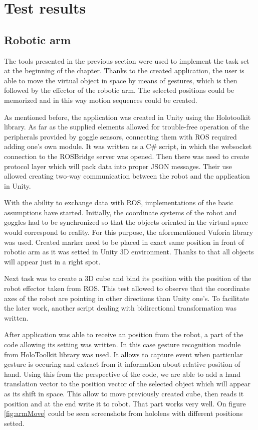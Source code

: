 \documentclass[printmode,en]{mgr}
\begin{document}
\section{Test results}

\subsection{Robotic arm}
The tools presented in the previous section were used to implement the task set at the beginning of the chapter. Thanks to the created application, the user is able to move the virtual object in space by means of gestures, which is then followed by the effector of the robotic arm. The selected positions could be memorized and in this way motion sequences could be created.

As mentioned before, the application was created in Unity using the Holotoolkit library. As far as the supplied elements allowed for trouble-free operation of the peripherals provided by goggle sensors, connecting them with ROS required adding one's own module. It was written as a C\# script, in which the websocket connection to the ROSBridge server was opened. Then there was need to create protocol layer which will pack data into proper JSON messages. Their use allowed creating two-way communication between the robot and the application in Unity.

With the ability to exchange data with ROS, implementations of the basic assumptions have started. Initially, the coordinate systems of the robot and goggles had to be synchronized so that the objects oriented in the virtual space would correspond to reality. For this purpose, the aforementioned Vuforia library was used. Created marker need to be placed in exact same position in front of robotic arm as it was setted in Unity 3D environment. Thanks to that all objects will appear just in a right spot.

Next task was to create a 3D cube and bind its position with the position of the robot effector taken from ROS. This test allowed to observe that the coordinate axes of the robot are pointing in other directions than Unity one's. To facilitate the later work, another script dealing with bidirectional transformation was written.

After application was able to receive an position from the robot, a part of the code allowing its setting was written. In this case gesture recognition module from HoloToolkit library was used. It allows to capture event when particular gesture is occuring and extract from it information about relative position of hand. Using this from the perspective of the code, we are able to add a hand translation vector to the position vector of the selected object which will appear as its shift in space. This allow to move previously created cube, then reads it position and at the end write it to robot. That part works very well. On figure \ref{fig:armMove} could be seen screenshots from hololens with different positions setted.
\end{document}
